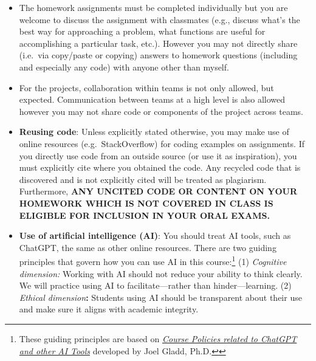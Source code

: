 \documentclass[
  letterpaper,
  DIV=11,
  numbers=noendperiod]{scrartcl}
\begin{document}
\begin{itemize}
\item
  The homework assignments must be completed individually but you are
  welcome to discuss the assignment with classmates (e.g., discuss
  what's the best way for approaching a problem, what functions are
  useful for accomplishing a particular task, etc.). However you may not
  directly share (i.e.~via copy/paste or copying) answers to homework
  questions (including and especially any code) with anyone other than
  myself.
\item
  For the projects, collaboration within teams is not only allowed, but
  expected. Communication between teams at a high level is also allowed
  however you may not share code or components of the project across
  teams.
\item
  \textbf{Reusing code}: Unless explicitly stated otherwise, you may
  make use of online resources (e.g.~StackOverflow) for coding examples
  on assignments. If you directly use code from an outside source (or
  use it as inspiration), you must explicitly cite where you obtained
  the code. Any recycled code that is discovered and is not explicitly
  cited will be treated as plagiarism. Furthermore, \textbf{ANY UNCITED
  CODE OR CONTENT ON YOUR HOMEWORK WHICH IS NOT COVERED IN CLASS IS
  ELIGIBLE FOR INCLUSION IN YOUR ORAL EXAMS.}
\item
  \textbf{Use of artificial intelligence (AI)}: You should treat AI
  tools, such as ChatGPT, the same as other online resources. There are
  two guiding principles that govern how you can use AI in this
  course:\footnote{These guiding principles are based on
    \href{https://docs.google.com/document/d/1WpCeTyiWCPQ9MNCsFeKMDQLSTsg1oKfNIH6MzoSFXqQ/preview}{\emph{Course
    Policies related to ChatGPT and other AI Tools}} developed by Joel
    Gladd,
    Ph.D.\href{https://sta101-f23.github.io/course-syllabus.html\#fnref1}{↩︎}}
  (1) \emph{Cognitive dimension:} Working with AI should not reduce your
  ability to think clearly. We will practice using AI to
  facilitate---rather than hinder---learning. (2) \emph{Ethical
  dimension}\textbf{:} Students using AI should be transparent about
  their use and make sure it aligns with academic integrity.


\end{itemize}
\end{document}
